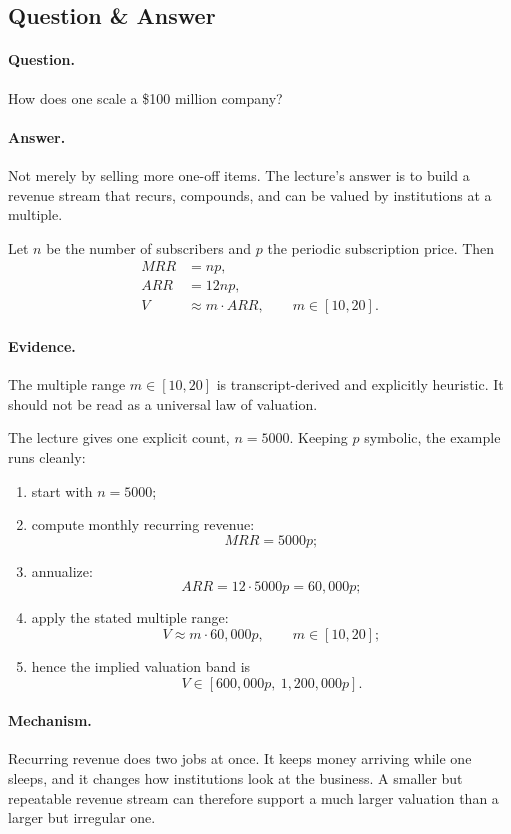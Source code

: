 \documentclass[11pt,oneside]{book}
\begin{document}
\subsection{Question \& Answer}

\paragraph{Question.} How does one scale a \$100 million company?

\paragraph{Answer.} Not merely by selling more one-off items. The lecture's answer is to build a revenue stream that recurs, compounds, and can be valued by institutions at a multiple.

Let \(n\) be the number of subscribers and \(p\) the periodic subscription price. Then
\begin{align}
MRR &= np,\\
ARR &= 12np,\\
V &\approx m\cdot ARR,
\qquad m \in [10,20].
\end{align}

\paragraph{Evidence.} The multiple range \(m \in [10,20]\) is transcript-derived and explicitly heuristic. It should not be read as a universal law of valuation.

The lecture gives one explicit count, \(n=5000\). Keeping \(p\) symbolic, the example runs cleanly:
\begin{enumerate}
\item start with \(n=5000\);
\item compute monthly recurring revenue:
\[
MRR = 5000p;
\]
\item annualize:
\[
ARR = 12\cdot 5000p = 60{,}000p;
\]
\item apply the stated multiple range:
\[
V \approx m\cdot 60{,}000p,
\qquad m \in [10,20];
\]
\item hence the implied valuation band is
\[
V \in [600{,}000p,\ 1{,}200{,}000p].
\]
\end{enumerate}

\paragraph{Mechanism.} Recurring revenue does two jobs at once. It keeps money arriving while one sleeps, and it changes how institutions look at the business. A smaller but repeatable revenue stream can therefore support a much larger valuation than a larger but irregular one.
\end{document}
